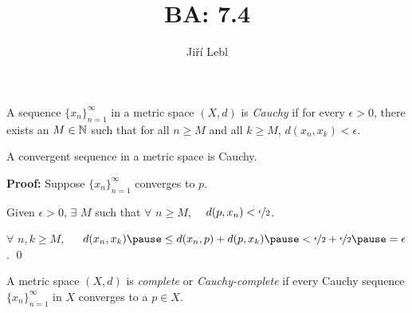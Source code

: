 \documentclass[10pt,aspectratio=169]{beamer}
\author{Ji\v{r}\'i Lebl}
\institute[OSU]{%
Departemento pri Matematiko de Oklahoma {\^S}tata Universitato}
\title{BA: 7.4}
\date{}
\begin{document}
\begin{frame}
\titlepage
\end{frame}

\begin{frame}
\begin{definition}
A sequence $\{ x_n \}_{n=1}^\infty$ in a metric space $(X,d)$ is \emph{Cauchy}
\pause
if
for every $\epsilon > 0$, there exists an $M \in {\mathbb{N}}$ such that
for all $n \geq M$ and all $k \geq M$,
\quad $d(x_n, x_k) < \epsilon$.
\end{definition}

\pause
\begin{proposition}
A convergent sequence in a metric space is Cauchy.
\end{proposition}

\pause
\textbf{Proof:}
Suppose $\{ x_n \}_{n=1}^\infty$ converges to $p$.

\pause
\medskip

\pause
Given $\epsilon > 0$, $\exists$ $M$ such that $\forall$ $n \geq M$,
~~$d(p,x_n) < \nicefrac{\epsilon}{2}$.

\pause
\medskip

\thus \quad $\forall$ $n,k \geq M$, ~~
$d(x_n,x_k)
\pause
\leq d(x_n,p) + d(p,x_k)
\pause
< \nicefrac{\epsilon}{2} + \nicefrac{\epsilon}{2}
\pause
= \epsilon$.
\qed

\pause
\begin{definition}
A metric space $(X,d)$ is
\emph{complete} or \emph{Cauchy-complete}
if every Cauchy sequence $\{ x_n \}_{n=1}^\infty$ in $X$
converges to a $p \in X$.
\end{definition}

\end{frame}
\end{document}
